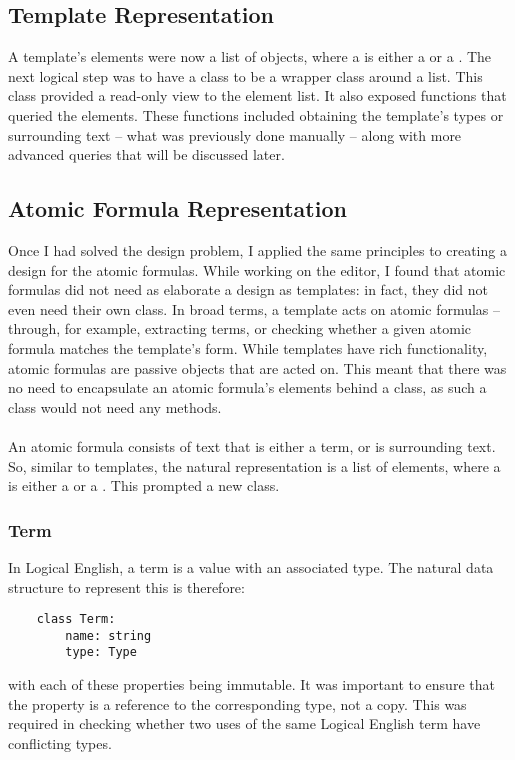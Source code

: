 \documentclass[../main.tex]{subfiles}
\begin{document}
\subsection{Template Representation}
A template's elements were now a list of  objects, where a  is either a  or a .
The next logical step was to have a  class to be a wrapper class around a  list. This  class provided a read-only view to the element list. It also exposed functions that queried the elements. These functions included obtaining the template's types or surrounding text -- what was previously done manually -- along with more advanced queries that will be discussed later.

\subsection{Atomic Formula Representation}
Once I had solved the  design problem, I applied the same principles to creating a design for the atomic formulas. While working on the editor, I found that atomic formulas did not need as elaborate a design as templates: in fact, they did not even need their own class. In broad terms, a template acts on atomic formulas --through, for example, extracting terms, or checking whether a given atomic formula matches the template's form. While templates have rich functionality, atomic formulas are passive objects that are acted on. This meant that there was no need to encapsulate an atomic formula's elements behind a class, as such a class would not need any methods.
\\
\\
An atomic formula consists of text that is either a term, or is surrounding text. So, similar to templates, the natural representation is a list of  elements, where a  is either a  or a . This prompted a new  class.

\subsubsection{Term}
In Logical English, a term is a value with an associated type. The natural data structure to represent this is therefore:
\begin{lstlisting}
    class Term:
        name: string
        type: Type
\end{lstlisting}
with each of these properties being immutable. It was important to ensure that the  property is a reference to the corresponding type, not a copy. This was required in checking whether two uses of the same Logical English term have conflicting types.
\end{document}

